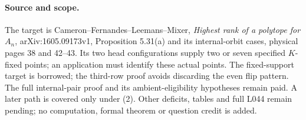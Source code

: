 \documentclass[11pt,a4paper]{article}
\begin{document}
\paragraph{Source and scope.}
The target is Cameron--Fernandes--Leemans--Mixer,
\emph{Highest rank of a polytope for $A_n$}, arXiv:1605.09173v1,
Proposition 5.31(a) and its internal-orbit cases, physical
pages 38 and 42--43. Its two head configurations supply two or
seven specified $K$-fixed points; an application must identify
these actual points. The fixed-support target is borrowed; the
third-row proof avoids discarding the even flip pattern. The full
internal-pair proof and its ambient-eligibility hypotheses remain
paid. A later path is covered only under (2). Other deficits,
tables and full L044 remain pending; no computation, formal theorem
or question credit is added.
\end{document}
